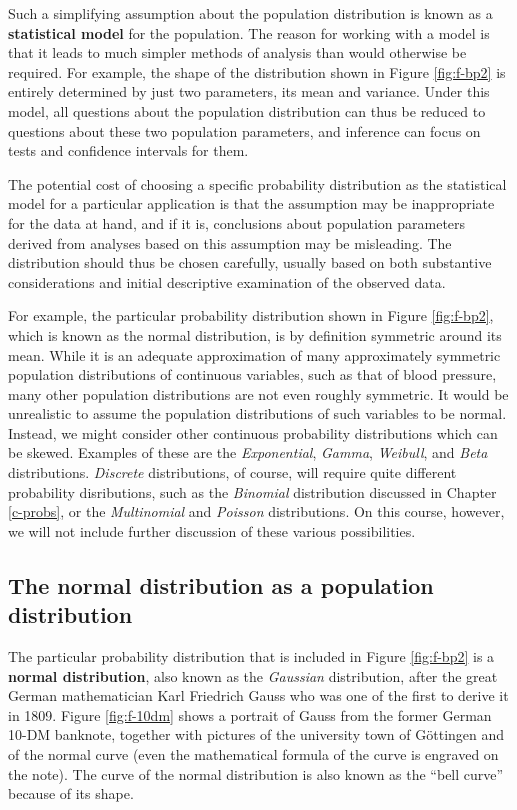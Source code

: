 \documentclass[11pt,a4paper,openany]{book}
\begin{document}
\label{p-model} Such a simplifying assumption about the population
distribution is known as a \textbf{statistical model} for the
population. The reason for working with a model is that it leads to much
simpler methods of analysis than would otherwise be required. For
example, the shape of the distribution shown in Figure \ref{fig:f-bp2}
is entirely determined by just two parameters, its mean and variance.
Under this model, all questions about the population distribution can
thus be reduced to questions about these two population parameters, and
inference can focus on tests and confidence intervals for them.

The potential cost of choosing a specific probability distribution as
the statistical model for a particular application is that the
assumption may be inappropriate for the data at hand, and if it is,
conclusions about population parameters derived from analyses based on
this assumption may be misleading. The distribution should thus be
chosen carefully, usually based on both substantive considerations and
initial descriptive examination of the observed data.

For example, the particular probability distribution shown in Figure
\ref{fig:f-bp2}, which is known as the normal distribution, is by
definition symmetric around its mean. While it is an adequate
approximation of many approximately symmetric population distributions
of continuous variables, such as that of blood pressure, many other
population distributions are not even roughly symmetric. It would be
unrealistic to assume the population distributions of such variables to
be normal. Instead, we might consider other continuous probability
distributions which can be skewed. Examples of these are the
\emph{Exponential}, \emph{Gamma}, \emph{Weibull}, and \emph{Beta}
distributions. \emph{Discrete} distributions, of course, will require
quite different probability disributions, such as the \emph{Binomial}
distribution discussed in Chapter \ref{c-probs}, or the
\emph{Multinomial} and \emph{Poisson} distributions. On this course,
however, we will not include further discussion of these various
possibilities.

\subsection{The normal distribution as a population
distribution}\label{ss-contd-probdistrs-normal}

The particular probability distribution that is included in Figure
\ref{fig:f-bp2} is a \textbf{normal distribution}, also known as the
\emph{Gaussian} distribution, after the great German mathematician Karl
Friedrich Gauss who was one of the first to derive it in 1809. Figure
\ref{fig:f-10dm} shows a portrait of Gauss from the former German 10-DM
banknote, together with pictures of the university town of Göttingen and
of the normal curve (even the mathematical formula of the curve is
engraved on the note). The curve of the normal distribution is also
known as the ``bell curve'' because of its shape.
\end{document}
